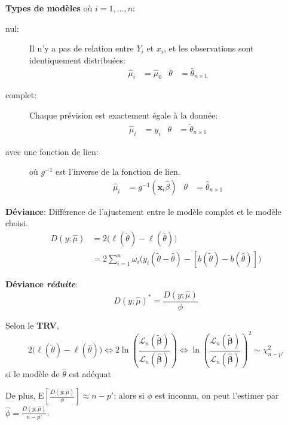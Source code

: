 \documentclass[10pt, french]{article}
\begin{document}
\begin{multicols*}{3}
\textbf{Types de modèles} où $i = 1, \dots, n$:
\begin{description}
	\item[nul: ] Il n'y a pas de relation entre $Y_{i}$ et $x_{i}$, et les observations sont identiquement distribuées:
	\begin{align*}
		\hat{\mu}_{i} &= \hat{\mu}_{0}	&
		\theta &= \bar{\theta}_{n \times 1}
	\end{align*}
	\item[complet: ] Chaque prévision est exactement égale à la donnée:
	\begin{align*}
		\hat{\mu}_{i} &= y_{i}	&
		\theta &= \tilde{\theta}_{n \times 1}
	\end{align*}
	\item[avec une fonction de lien: ] où $g^{-1}$ est l'inverse de la fonction de lien.
	\begin{align*}
		\hat{\mu}_{i} &= g^{-1}(\bm{x}_{i}\hat{\beta})	&
		\theta &= \hat{\theta}_{n \times 1}
	\end{align*}
\end{description}

\textbf{Déviance}: Différence de l'ajustement entre le modèle complet et le modèle choisi.
	\begin{align*}
		D(y; \hat{\mu}) 
		&= 	2 \big(\ell(\tilde{\theta}) - \ell(\hat{\theta})\big) \\
		&= 	2 \sum_{i = 1}^{n} \omega_{i} \bigg( y_{i} (\tilde{\theta} - \hat{\theta}) - [b(\tilde{\theta}) - b(\hat{\theta})] \bigg)
	\end{align*}
	
\textbf{Déviance \textit{réduite}}:
	\begin{equation*}
		D(y; \hat{\mu})^{*} = \frac{D(y; \hat{\mu})}{\phi}
	\end{equation*}

Selon le \textbf{TRV}, 
\begin{equation*}
	2 	\big(\ell(\tilde{\theta}) - \ell(\hat{\theta})\big) 
\Leftrightarrow 
	2	\ln \left(\frac{\mathcal{L}_n(\bm{\tilde{\beta}})}{\mathcal{L}_n(\bm{\hat{\beta}})}\right)
\Leftrightarrow 
	\ln \left(\frac{\mathcal{L}_n(\bm{\tilde{\beta}})}{\mathcal{L}_n(\bm{\hat{\beta}})}\right	)^{2}
	\sim	\chi^{2}_{n - p'}
\end{equation*}
 si le modèle de $\hat{\theta}$ est adéquat	

De plus, $\text{E}\left[\frac{D(y; \hat{\mu})}{\phi}\right] \approx n - p'$; alors si $\phi$ est inconnu, on peut l'estimer par $\hat{\phi} = \frac{D(y ; \hat{\mu})}{n - p'}$.


\end{multicols*}
\end{document}

